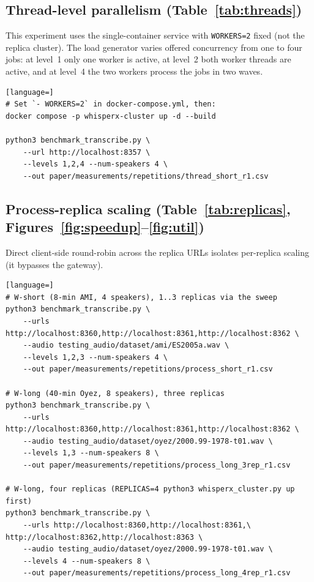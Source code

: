 \documentclass[10pt]{article}
\begin{document}
\subsection{Thread-level parallelism (Table~\ref{tab:threads})}
This experiment uses the single-container service with \texttt{WORKERS=2} fixed
(not the replica cluster). The load
generator varies offered concurrency from one to four jobs: at level~1 only one
worker is active, at level~2 both worker threads are active, and at level~4 the
two workers process the jobs in two waves.
\begin{lstlisting}[language=]
# Set `- WORKERS=2` in docker-compose.yml, then:
docker compose -p whisperx-cluster up -d --build

python3 benchmark_transcribe.py \
    --url http://localhost:8357 \
    --levels 1,2,4 --num-speakers 4 \
    --out paper/measurements/repetitions/thread_short_r1.csv
\end{lstlisting}

\subsection{Process-replica scaling
(Table~\ref{tab:replicas}, Figures~\ref{fig:speedup}--\ref{fig:util})}
Direct client-side round-robin across the replica URLs isolates per-replica
scaling (it bypasses the gateway).
\begin{lstlisting}[language=]
# W-short (8-min AMI, 4 speakers), 1..3 replicas via the sweep
python3 benchmark_transcribe.py \
    --urls http://localhost:8360,http://localhost:8361,http://localhost:8362 \
    --audio testing_audio/dataset/ami/ES2005a.wav \
    --levels 1,2,3 --num-speakers 4 \
    --out paper/measurements/repetitions/process_short_r1.csv

# W-long (40-min Oyez, 8 speakers), three replicas
python3 benchmark_transcribe.py \
    --urls http://localhost:8360,http://localhost:8361,http://localhost:8362 \
    --audio testing_audio/dataset/oyez/2000.99-1978-t01.wav \
    --levels 1,3 --num-speakers 8 \
    --out paper/measurements/repetitions/process_long_3rep_r1.csv

# W-long, four replicas (REPLICAS=4 python3 whisperx_cluster.py up first)
python3 benchmark_transcribe.py \
    --urls http://localhost:8360,http://localhost:8361,\
http://localhost:8362,http://localhost:8363 \
    --audio testing_audio/dataset/oyez/2000.99-1978-t01.wav \
    --levels 4 --num-speakers 8 \
    --out paper/measurements/repetitions/process_long_4rep_r1.csv
\end{lstlisting}
\end{document}
